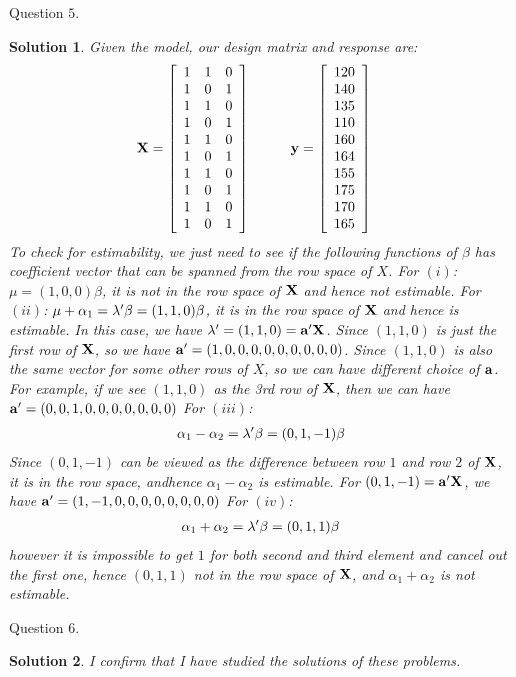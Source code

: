 \documentclass[11pt]{article}
\newtheorem{sol}{Solution}
\begin{document}
Question $5$.
\begin{sol}
	Given the model, our design matrix and response are:
	\begin{align*}
		{\bf X} &= \left[\begin{array}{ccc} 1&1&0\\ 1&0&1\\ 1&1&0\\ 1&0&1\\ 1&1&0\\ 1&0&1\\ 1&1&0\\ 1&0&1\\ 1&1&0\\1&0&1 \end{array}\right]\hskip 1cm {\bf y} = \left[\begin{array}{c}120 \\140 \\135 \\110 \\160 \\164 \\155 \\175 \\170 \\165 \end{array}\right]
	\end{align*}
	To check for estimability, we just need to see if the following functions of $\beta$ has coefficient vector that can be spanned from the row space of $X$.\vskip 2mm
	For $(i)$:\vskip 2mm
	$\mu = (1, 0, 0)\beta$, it is not in the row space of ${\bf X}$ and hence not estimable.\vskip 2mm
	For $(ii)$:\vskip 2mm
	$\mu + \alpha_1 = {\bf \lambda}'\beta = (1, 1, 0)\beta$, it is in the row space of ${\bf X}$ and hence is estimable. In this case, we have $\lambda' = (1, 1, 0) = {\bf a}'{\bf X}$. Since $(1, 1, 0)$ is just the first row of ${\bf X}$, so we have ${\bf a}' = (1, 0, 0, 0, 0, 0, 0, 0, 0, 0)$.\vskip 2mm
	Since $(1, 1, 0)$ is also the same vector for some other rows of $X$, so we can have different choice of ${\bf a}$. For example, if we see $(1, 1, 0)$ as the 3rd row of ${\bf X}$, then we can have ${\bf a}' = (0, 0, 1, 0, 0, 0, 0, 0, 0, 0)$\vskip 2mm
	For $(iii)$:
	\begin{align*}
		\alpha_1- \alpha_2 = {\bf \lambda}'\beta = (0, 1, -1)\beta
	\end{align*}
	Since $(0, 1, -1)$ can be viewed as the difference between row $1$ and row $2$ of ${\bf X}$, it is in the row space, andhence $\alpha_1 - \alpha_2$ is estimable.\vskip 2mm
	For $(0, 1, -1)= {\bf a}'{\bf X}$, we have ${\bf a}' = (1, -1, 0, 0, 0, 0, 0, 0, 0, 0)$\vskip 2mm
	For $(iv)$:
	\begin{align*}
		\alpha_1+ \alpha_2 = {\bf \lambda}'\beta = (0, 1, 1)\beta
	\end{align*}
	however it is impossible to get $1$ for both second and third element and cancel out the first one, hence $(0, 1, 1)$ not in the row space of ${\bf X}$, and $\alpha_1 + \alpha_2$ is not estimable.
\end{sol}

Question $6$.
\begin{sol}
I confirm that I have studied the solutions of these problems.
\end{sol}
\end{document}
